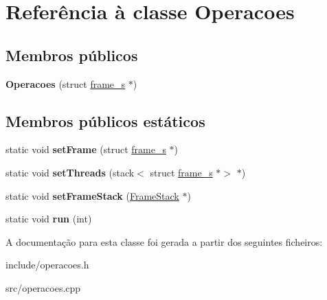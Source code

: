 \hypertarget{classOperacoes}{}\section{Referência à classe Operacoes}
\label{classOperacoes}
\subsection*{Membros públicos}
\begin{DoxyCompactItemize}
\item 
\mbox{\label{classOperacoes_a2122b7e6890e56a386118b62b32a7523}} 
{\bfseries Operacoes} (struct \hyperlink{structframe__s}{frame\+\_\+s} $\ast$)
\end{DoxyCompactItemize}
\subsection*{Membros públicos estáticos}
\begin{DoxyCompactItemize}
\item 
\mbox{\label{classOperacoes_a787f291554d319e73daa2e91d77823bd}} 
static void {\bfseries set\+Frame} (struct \hyperlink{structframe__s}{frame\+\_\+s} $\ast$)
\item 
\mbox{\label{classOperacoes_ac50ddb76ffb9bcd17ac19e449ac52e39}} 
static void {\bfseries set\+Threads} (stack$<$ struct \hyperlink{structframe__s}{frame\+\_\+s} $\ast$$>$ $\ast$)
\item 
\mbox{\label{classOperacoes_a458ce9c1aec4fd809eecee9b005fcbf5}} 
static void {\bfseries set\+Frame\+Stack} (\hyperlink{classFrameStack}{Frame\+Stack} $\ast$)
\item 
\mbox{\label{classOperacoes_ac25eec2246429c071161b918ec447b18}} 
static void {\bfseries run} (int)
\end{DoxyCompactItemize}


A documentação para esta classe foi gerada a partir dos seguintes ficheiros\+:\begin{DoxyCompactItemize}
\item 
include/operacoes.\+h\item 
src/operacoes.\+cpp\end{DoxyCompactItemize}
